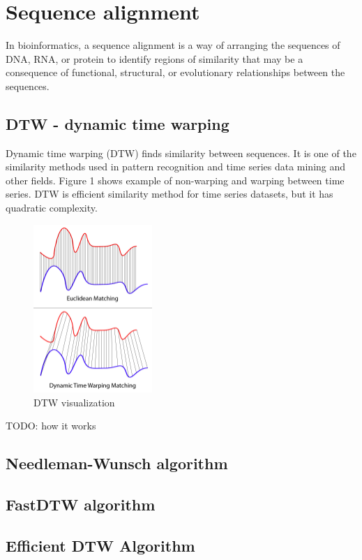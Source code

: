 \chapter{Sequence alignment}

\label{kap:sequence_alignment} %

In bioinformatics, a sequence alignment is a way of arranging the sequences of DNA, RNA, or protein
to identify regions of similarity that may be a consequence of functional, structural, or
evolutionary relationships between the sequences. \cite{Gollery2005BioinformaticsSA}

\section{DTW - dynamic time warping}
Dynamic time warping (DTW) finds similarity between sequences. It is one of the similarity methods
used in pattern recognition and time series data mining and other fields. Figure 1 shows example
of non-warping and warping between time series. DTW is efficient similarity method for time series
datasets, but it has quadratic complexity.

\begin{figure}[H]
  \centerline{\includegraphics[width=0.4\textwidth]{images/dtw}}
  \caption[DTW]{DTW visualization}
  \label{obr:minion}
\end{figure}

TODO: how it works

\section{Needleman-Wunsch algorithm}

\section{FastDTW algorithm}

\section{Efficient DTW Algorithm}

